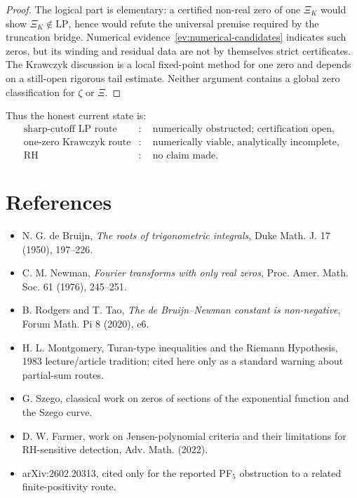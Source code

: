 \documentclass[11pt]{article}
\newcommand{\LP}{\mathrm{LP}}
\newcommand{\zetaR}{\zeta}
\begin{document}
\begin{proof}
The logical part is elementary: a certified non-real zero of one $\Xi_K$ would
show $\Xi_K\notin\LP$, hence would refute the universal premise required by
the truncation bridge.  Numerical evidence~\ref{ev:numerical-candidates}
indicates such zeros, but its winding and residual data are not by themselves
strict certificates.  The Krawczyk discussion is a local fixed-point method
for one zero and depends on a still-open rigorous tail estimate.  Neither
argument contains a global zero classification for $\zetaR$ or $\Xi$.
\end{proof}

Thus the honest current state is:
$$
\begin{aligned}
\text{sharp-cutoff LP route} &:\quad \text{numerically obstructed; certification open},\\
\text{one-zero Krawczyk route} &:\quad \text{numerically viable, analytically incomplete},\\
\text{RH} &:\quad \text{no claim made}.
\end{aligned}
$$

\section*{References}

\begin{itemize}
\item N. G. de Bruijn, \emph{The roots of trigonometric integrals}, Duke Math.
J. 17 (1950), 197--226.
\item C. M. Newman, \emph{Fourier transforms with only real zeros}, Proc.
Amer. Math. Soc. 61 (1976), 245--251.
\item B. Rodgers and T. Tao, \emph{The de Bruijn--Newman constant is
non-negative}, Forum Math. Pi 8 (2020), e6.
\item H. L. Montgomery, Turan-type inequalities and the Riemann Hypothesis,
1983 lecture/article tradition; cited here only as a standard warning about
partial-sum routes.
\item G. Szego, classical work on zeros of sections of the exponential
function and the Szego curve.
\item D. W. Farmer, work on Jensen-polynomial criteria and their limitations
for RH-sensitive detection, Adv. Math. (2022).
\item arXiv:2602.20313, cited only for the reported PF$_5$ obstruction to a
related finite-positivity route.
\end{itemize}
\end{document}
